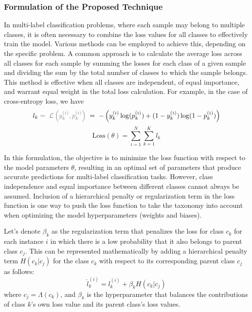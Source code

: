 \documentclass[final,1p,times,authoryear]{elsarticle}
\begin{document}
\subsubsection{Formulation of the Proposed Technique}
In multi-label classification problems, where each sample may belong to multiple classes, it is often necessary to combine the loss values for all classes to effectively train the model. Various methods can be employed to achieve this, depending on the specific problem. A common approach is to calculate the average loss across all classes for each sample by summing the losses for each class of a given sample and dividing the sum by the total number of classes to which the sample belongs. This method is effective when all classes are independent, of equal importance, and warrant equal weight in the total loss calculation. For example, in the case of cross-entropy loss, we have
\begin{equation}
    l_k \textcolor{gray}{\; = \; \mathcal{L} \left(y_k^{(i)},p_k^{(i)}\right)} \; = \; -\left(y_k^{(i)}\log(p_k^{(i)}) + (1 - y_k^{(i)})\log(1 - p_k^{(i)})\right)
    \label{eq:taxonomy.eq.2.loss}
\end{equation}
\begin{equation}
    \text{Loss}(\theta) = \sum_{i=1}^{N}\sum_{k=1}^{K}l_k
    \label{eq:taxonomy.eq.3.totalloss}
\end{equation}

In this formulation, the objective is to minimize the loss function with respect to the model parameters $\theta $, resulting in an optimal set of parameters that produce accurate predictions for multi-label classification tasks. However, class independence and equal importance between different classes cannot always be assumed. Inclusion of a hierarchical penalty or regularization term in the loss function is one way to push the loss function to take the taxonomy into account when optimizing the model hyperparameters (weights and biases).

Let's denote $\beta_k$ as the regularization term that penalizes the loss for class $c_k$ for each instance $i $ in which there is a low probability that it also belongs to parent class $c_j$. This can be represented mathematically by adding a hierarchical penalty term $H(c_k \vert c_j)$ for the class $c_k$ with respect to its corresponding parent class $c_j$ as follows:
\begin{equation}
    \widehat{l}_{k}^{(i)} = l_{k}^{(i)}+\beta_k H \left(c_k \vert c_j \right)
    \label{eq:taxonomy.eq.3.newloss}
\end{equation}
where $c_j=\Lambda(c_k)$, and $\beta_k $ is the hyperparameter that balances the contributions of class $k$'s own loss value and its parent class's loss values.
\end{document}
